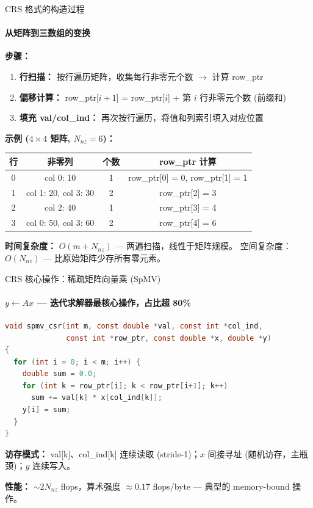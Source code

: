 \documentclass[12pt,aspectratio=169]{beamer}
\begin{document}
\begin{frame}[shrink]{CRS 格式的构造过程}
\framesubtitle{从矩阵到三数组的变换}

\textbf{步骤：}
\begin{enumerate}
  \item \textbf{行扫描：} 按行遍历矩阵，收集每行非零元个数 $\to$ 计算 row\_ptr
  \item \textbf{偏移计算：} row\_ptr[$i+1$] = row\_ptr[$i$] + 第 $i$ 行非零元个数 (前缀和)
  \item \textbf{填充 val/col\_ind：} 再次按行遍历，将值和列索引填入对应位置
\end{enumerate}

\vspace{6pt}
\textbf{示例 ($4\times 4$ 矩阵, $N_{\!nz}=6$)：}

\small
\renewcommand{\arraystretch}{1.3}
\begin{tabular}{c|c|c|c}
\textbf{行} & \textbf{非零列} & \textbf{个数} & \textbf{row\_ptr 计算} \\
\hline
0 & col 0: 10                    & 1 & row\_ptr[0] = 0, row\_ptr[1] = 1 \\
1 & col 1: 20, col 3: 30         & 2 & row\_ptr[2] = 3 \\
2 & col 2: 40                    & 1 & row\_ptr[3] = 4 \\
3 & col 0: 50, col 3: 60         & 2 & row\_ptr[4] = 6 \\
\end{tabular}
\normalsize

\vspace{6pt}
\textbf{时间复杂度：} $O(m + N_{\!nz})$ — 两遍扫描，线性于矩阵规模。
空间复杂度：$O(N_{\!nz})$ — 比原始矩阵少存所有零元素。
\end{frame}

\begin{frame}[fragile]{CRS 核心操作：稀疏矩阵向量乘 (SpMV)}
\framesubtitle{$y \leftarrow A x$ — 迭代求解器最核心操作，占比超 80\%}

\small
\begin{lstlisting}[language=C,basicstyle=\ttfamily\footnotesize,belowskip=-4pt]
void spmv_csr(int m, const double *val, const int *col_ind,
              const int *row_ptr, const double *x, double *y)
{
  for (int i = 0; i < m; i++) {
    double sum = 0.0;
    for (int k = row_ptr[i]; k < row_ptr[i+1]; k++)
      sum += val[k] * x[col_ind[k]];
    y[i] = sum;
  }
}
\end{lstlisting}

\vspace{2pt}
\footnotesize
\textbf{访存模式：} val[k]、col\_ind[k] 连续读取 (stride-1)；$x$ 间接寻址 (随机访存，主瓶颈)；$y$ 连续写入。

\vspace{2pt}
\textbf{性能：} $\sim 2N_{\!nz}$ flops，算术强度 $\approx 0.17$ flops/byte — 典型的 memory-bound 操作。
\end{frame}
\end{document}
